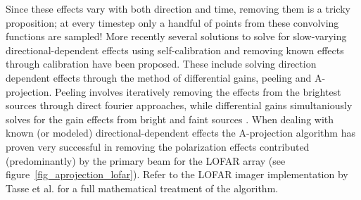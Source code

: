 Since these effects vary with both direction and time, removing them is a tricky proposition; at every timestep only a 
handful of points from these convolving functions are sampled! More recently several solutions to solve for slow-varying 
directional-dependent effects using self-calibration and removing known effects through calibration have been proposed. 
These include solving direction dependent effects through the method of differential gains, peeling and A-projection. Peeling 
involves iteratively removing the effects from the brightest sources through direct fourier approaches, while differential 
gains simultaniously solves for the gain effects from bright and faint sources \cite{2011A&A...527A.107S,2011A&A...527A.108S}. 
When dealing with known (or modeled) directional-dependent effects the A-projection algorithm \cite{bhatnagar2008correcting} has 
proven very successful in removing the polarization effects contributed (predominantly) by the primary beam for the 
LOFAR array (see figure~\ref{fig_aprojection_lofar}). Refer to the LOFAR imager implementation by Tasse et 
al. \cite{tasse2013applying} for a full mathematical treatment of the algorithm.

